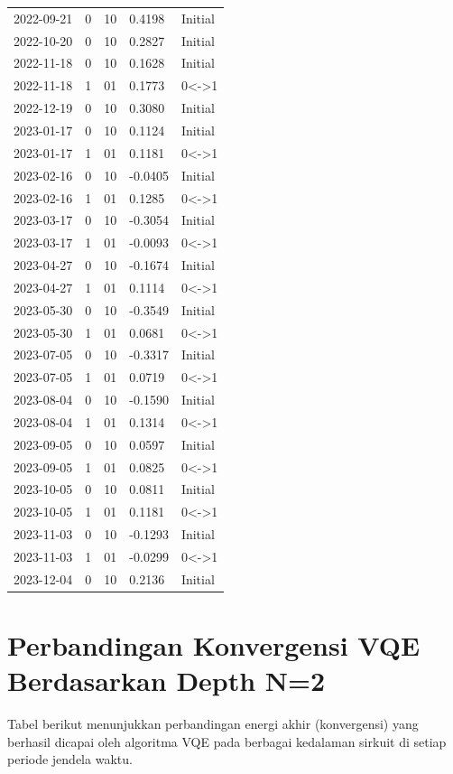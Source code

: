 \begin{footnotesize}
\begin{longtable}{lllll}
2022-09-21 & 0 & 10 & 0.4198 & Initial \\
2022-10-20 & 0 & 10 & 0.2827 & Initial \\
2022-11-18 & 0 & 10 & 0.1628 & Initial \\
2022-11-18 & 1 & 01 & 0.1773 & 0<->1 \\
2022-12-19 & 0 & 10 & 0.3080 & Initial \\
2023-01-17 & 0 & 10 & 0.1124 & Initial \\
2023-01-17 & 1 & 01 & 0.1181 & 0<->1 \\
2023-02-16 & 0 & 10 & -0.0405 & Initial \\
2023-02-16 & 1 & 01 & 0.1285 & 0<->1 \\
2023-03-17 & 0 & 10 & -0.3054 & Initial \\
2023-03-17 & 1 & 01 & -0.0093 & 0<->1 \\
2023-04-27 & 0 & 10 & -0.1674 & Initial \\
2023-04-27 & 1 & 01 & 0.1114 & 0<->1 \\
2023-05-30 & 0 & 10 & -0.3549 & Initial \\
2023-05-30 & 1 & 01 & 0.0681 & 0<->1 \\
2023-07-05 & 0 & 10 & -0.3317 & Initial \\
2023-07-05 & 1 & 01 & 0.0719 & 0<->1 \\
2023-08-04 & 0 & 10 & -0.1590 & Initial \\
2023-08-04 & 1 & 01 & 0.1314 & 0<->1 \\
2023-09-05 & 0 & 10 & 0.0597 & Initial \\
2023-09-05 & 1 & 01 & 0.0825 & 0<->1 \\
2023-10-05 & 0 & 10 & 0.0811 & Initial \\
2023-10-05 & 1 & 01 & 0.1181 & 0<->1 \\
2023-11-03 & 0 & 10 & -0.1293 & Initial \\
2023-11-03 & 1 & 01 & -0.0299 & 0<->1 \\
2023-12-04 & 0 & 10 & 0.2136 & Initial \\
\end{longtable}
\end{footnotesize}

\section{Perbandingan Konvergensi VQE Berdasarkan Depth N=2}

Tabel berikut menunjukkan perbandingan energi akhir (konvergensi) yang berhasil dicapai oleh algoritma VQE pada berbagai kedalaman sirkuit di setiap periode jendela waktu. 

